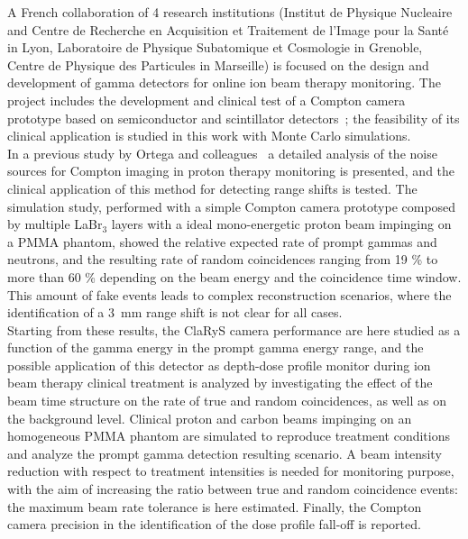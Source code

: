 A French collaboration of 4 research institutions (Institut de Physique Nucleaire and Centre de Recherche en Acquisition et Traitement de l'Image pour la Santé in Lyon, Laboratoire de Physique Subatomique et Cosmologie in Grenoble, Centre de Physique des Particules in Marseille) is focused on the design and development of gamma detectors for online ion beam therapy monitoring. The project includes the development and clinical test of a Compton camera prototype based on semiconductor and scintillator detectors~\cite{krimmer:hal-01101334}; the feasibility of its clinical application is studied in this work with Monte Carlo simulations.\\ 
In a previous study by Ortega and colleagues~\cite{Ortega:2015aa} a detailed analysis of the noise sources for Compton imaging in proton therapy monitoring is presented, and the clinical application of this method for detecting range shifts is tested. The simulation study, performed with a simple Compton camera prototype composed by multiple LaBr$_3$ layers with a ideal mono-energetic proton beam impinging on a PMMA phantom, showed the relative expected rate of prompt gammas and neutrons, and the resulting rate of random coincidences ranging from 19 \% to more than 60 \% depending on the beam energy and the coincidence time window. This amount of fake events leads to complex reconstruction scenarios, where the identification of a 3~mm range shift is not clear for all cases.\\    
Starting from these results, the ClaRyS camera performance are here studied as a function of the gamma energy in the prompt gamma energy range, and the possible application of this detector as depth-dose profile monitor during ion beam therapy clinical treatment is analyzed by investigating the effect of the beam time structure on the rate of true and random coincidences, as well as on the background level. Clinical proton and carbon beams impinging on an homogeneous PMMA phantom are simulated to reproduce treatment conditions and analyze the prompt gamma detection resulting scenario. A beam intensity reduction with respect to treatment intensities is needed for monitoring purpose, with the aim of increasing the ratio between true and random coincidence events: the maximum beam rate tolerance is here estimated. Finally, the Compton camera precision in the identification of the dose profile fall-off is reported.   

